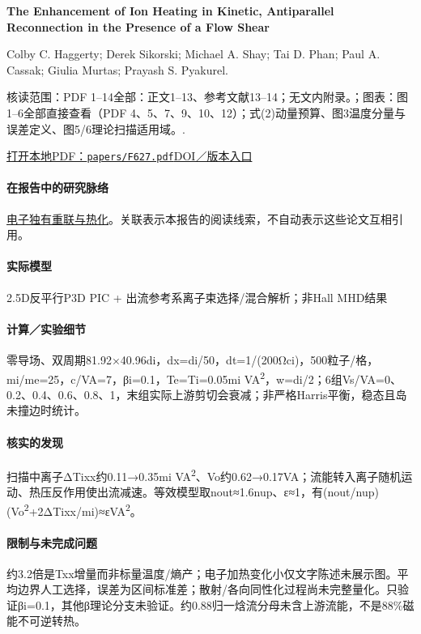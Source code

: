 \textbf{The Enhancement of Ion Heating in Kinetic,  Antiparallel Reconnection in the Presence of a Flow Shear}\citep{F627}\

Colby C. Haggerty;  Derek Sikorski;  Michael A. Shay;  Tai D. Phan;  Paul A. Cassak;  Giulia Murtas;  Prayash S. Pyakurel.

\textsf{核读范围：}PDF 1–14全部：正文1–13、参考文献13–14；无文内附录。；\textsf{图表：}图1–6全部直接查看（PDF 4、5、7、9、10、12）；式(2)动量预算、图3温度分量与误差定义、图5/6理论扫描适用域。.

\href{run:papers/F627.pdf}{打开本地PDF：\texttt{papers/F627.pdf}}\quad\href{https://doi.org/10.3847/1538-4357/ae2014}{DOI／版本入口}

\paragraph{在报告中的研究脉络}\hyperref[story:energy]{电子独有重联与热化}。关联表示本报告的阅读线索，不自动表示这些论文互相引用。

\paragraph{实际模型}2.5D反平行P3D PIC + 出流参考系离子束选择/混合解析；非Hall MHD结果

\paragraph{计算／实验细节}零导场、双周期81.92×40.96di，dx=di/50，dt=1/(200Ωci)，500粒子/格，mi/me=25，c/VA=7，βi=0.1，Te=Ti=0.05mi VA\textsuperscript{2}，w=di/2；6组Vs/VA=0、0.2、0.4、0.6、0.8、1，末组实际上游剪切会衰减；非严格Harris平衡，稳态且岛未撞边时统计。

\paragraph{核实的发现}扫描中离子ΔTixx约0.11→0.35mi VA\textsuperscript{2}、Vo约0.62→0.17VA；流能转入离子随机运动、热压反作用使出流减速。等效模型取nout≈1.6nup、ε≈1，有(nout/nup)(Vo\textsuperscript{2}+2ΔTixx/mi)≈εVA\textsuperscript{2}。

\paragraph{限制与未完成问题}约3.2倍是Txx增量而非标量温度/熵产；电子加热变化小仅文字陈述未展示图。平均边界人工选择，误差为区间标准差；散射/各向同性化过程尚未完整量化。只验证βi=0.1，其他β理论分支未验证。约0.88归一焓流分母未含上游流能，不是88\%磁能不可逆转热。

